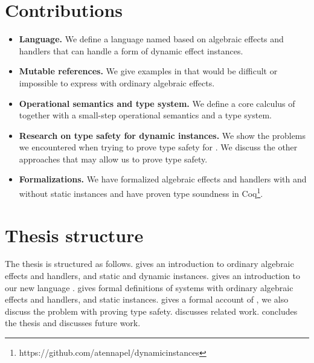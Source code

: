 \section*{Contributions}
\begin{itemize}

\item \textbf{Language.}
We define a language named \lang{} based on algebraic effects and handlers that can handle a form of dynamic effect instances.

\item \textbf{Mutable references.}
We give examples in \lang{} that would be difficult or impossible to express with ordinary algebraic effects.

\item \textbf{Operational semantics and type system.}
We define a core calculus of \lang{} together with a small-step operational semantics and a type system.

\item \textbf{Research on type safety for dynamic instances.}
We show the problems we encountered when trying to prove type safety for \lang{}.
We discuss the other approaches that may allow us to prove type safety.

\item \textbf{Formalizations.}
We have formalized algebraic effects and handlers with and without static instances and have proven type soundness in Coq\footnote{https://github.com/atennapel/dynamicinstances}.

\end{itemize}

\section*{Thesis structure}
The thesis is structured as follows.
 gives an introduction to ordinary algebraic effects and handlers, and static and dynamic instances.
 gives an introduction to our new language \lang{}.
 gives formal definitions of systems with ordinary algebraic effects and handlers, and static instances.
 gives a formal account of \lang{}, we also discuss the problem with proving type safety.
 discusses related work.
 concludes the thesis and discusses future work.
